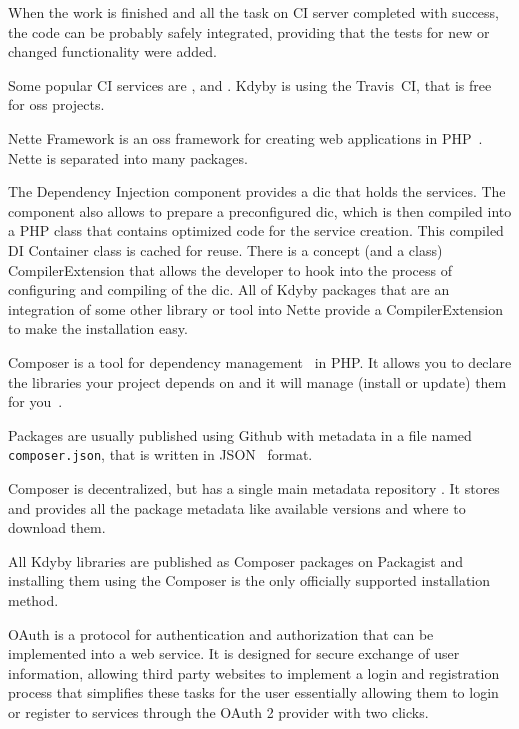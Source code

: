 When the work is finished and all the task on CI server completed with success, the code can be probably safely integrated, providing that the tests for new or changed functionality were added.

Some popular CI services are ,  and . Kdyby is using the Travis~CI, that is free for \gls{oss} projects.

 \label{sec:theory:nette}

Nette Framework is an \gls{oss} framework for creating web applications in PHP~\cite{wiki:nette}. Nette is separated into many packages.

The Dependency Injection component  provides a \gls{dic} that holds the services. The component also allows to prepare a preconfigured \gls{dic}, which is then compiled into a PHP class that contains optimized code for the service creation. This compiled DI Container class is cached for reuse. There is a concept (and a class) CompilerExtension that allows the developer to hook into the process of configuring and compiling of the \gls{dic}. All of Kdyby packages that are an integration of some other library or tool into Nette provide a CompilerExtension to make the installation easy.

 \label{sec:theory:composer}

Composer is a tool for dependency management~\cite{wiki:package-manager} in PHP. It allows you to declare the libraries your project depends on and it will manage (install or update) them for you~\cite{composer:docs:intro}.

Packages are usually published using Github with metadata in a file named \lstinline{composer.json}, that is written in JSON~\cite{wiki:json} format.

Composer is decentralized, but has a single main metadata repository . It stores and provides all the package metadata like available versions and where to download them.

All Kdyby libraries are published as Composer packages on Packagist and installing them using the Composer is the only officially supported installation method.

 \label{sec:theory:oauth2}

OAuth is a protocol for authentication and authorization that can be implemented into a web service. It is designed for secure exchange of user information, allowing third party websites to implement a login and registration process that simplifies these tasks for the user essentially allowing them to login or register to services through the OAuth 2 provider with two clicks.

